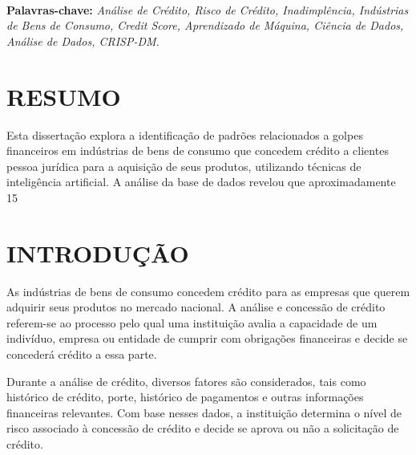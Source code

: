 \documentclass[12pt,a4paper]{article}
\begin{document}
\\[0.5cm]
\begin{flushleft}
{\bf Palavras-chave:} {\it Análise de Crédito, Risco de Crédito, Inadimplência, Indústrias de Bens de Consumo, Credit Score, Aprendizado de Máquina, Ciência de Dados, Análise de Dados, CRISP-DM.}
\end{flushleft}

\newpage
\thispagestyle{empty}
\tableofcontents

\newpage
\pagestyle{plain}
\renewcommand{\baselinestretch}{1.5}
\normalsize
\section{RESUMO}
Esta dissertação explora a identificação de padrões relacionados a golpes financeiros em indústrias de bens de consumo que concedem crédito a clientes pessoa jurídica para a aquisição de seus produtos, utilizando técnicas de inteligência artificial. A análise da base de dados revelou que aproximadamente 15%



\section{INTRODUÇÃO}
As indústrias de bens de consumo concedem crédito para as empresas que querem adquirir seus produtos no mercado nacional. A análise e concessão de crédito referem-se ao processo pelo qual uma instituição avalia a capacidade de um indivíduo, empresa ou entidade de cumprir com obrigações financeiras e decide se concederá crédito a essa parte.

Durante a análise de crédito, diversos fatores são considerados, tais como histórico de crédito, porte, histórico de pagamentos e outras informações financeiras relevantes. Com base nesses dados, a instituição determina o nível de risco associado à concessão de crédito e decide se aprova ou não a solicitação de crédito.
\end{document}
